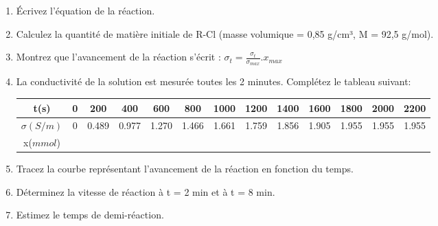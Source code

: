 \documentclass[12pt]{article}
\begin{document}
\begin{enumerate}
  \item Écrivez l'équation de la réaction.
  \item Calculez la quantité de matière initiale de R-Cl (masse volumique = 0,85 g/cm³, M = 92,5 g/mol).
  \item Montrez que l'avancement de la réaction s'écrit : \(\sigma_t = \frac{\sigma_t}{\sigma_{max}}.x_{max}\)
  \item La conductivité de la solution est mesurée toutes les 2 minutes. Complétez le tableau suivant:

    \begin{center}
		      \begin{tabular}{|c|c|c|c|c|c|c|c|c|c|c|c|c|}
			      \hline
			      t(s)          & 0 & 200   & 400   & 600   & 800   & 1000  & 1200  & 1400  & 1600  & 1800  & 2000  & 2200  \\\hline
			      $\sigma(S/m)$ & 0 & 0.489 & 0.977 & 1.270 & 1.466 & 1.661 & 1.759 & 1.856 & 1.905 & 1.955 & 1.955 & 1.955 \\\hline
			      x($mmol$)     & & & & & & & & & & & & \\\hline
		      \end{tabular}
	      \end{center}


  \item Tracez la courbe représentant l'avancement de la réaction en fonction du temps.
  \item Déterminez la vitesse de réaction à t = 2 min et à t = 8 min.
  \item Estimez le temps de demi-réaction.
\end{enumerate}
\end{document}
